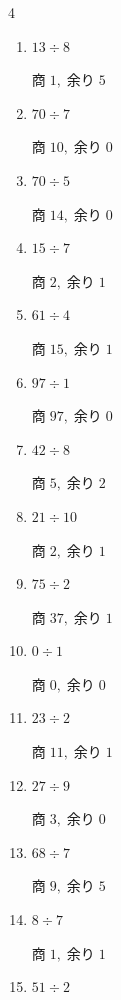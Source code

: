 \begin{multicols}{4}
\begin{enumerate}
        $商\; 80,\; 余り\; 0$

  \item $13 \div 8$

        $商\; 1,\; 余り\; 5$

  \item $70 \div 7$

        $商\; 10,\; 余り\; 0$

  \item $70 \div 5$

        $商\; 14,\; 余り\; 0$

  \item $15 \div 7$

        $商\; 2,\; 余り\; 1$

  \item $61 \div 4$

        $商\; 15,\; 余り\; 1$

  \item $97 \div 1$

        $商\; 97,\; 余り\; 0$

  \item $42 \div 8$

        $商\; 5,\; 余り\; 2$

  \item $21 \div 10$

        $商\; 2,\; 余り\; 1$

  \item $75 \div 2$

        $商\; 37,\; 余り\; 1$

  \item $0 \div 1$

        $商\; 0,\; 余り\; 0$

  \item $23 \div 2$

        $商\; 11,\; 余り\; 1$

  \item $27 \div 9$

        $商\; 3,\; 余り\; 0$

\columnbreak %

\resetques

  \item $68 \div 7$

        $商\; 9,\; 余り\; 5$

  \item $8 \div 7$

        $商\; 1,\; 余り\; 1$

  \item $51 \div 2$


\end{enumerate}
\end{multicols}
